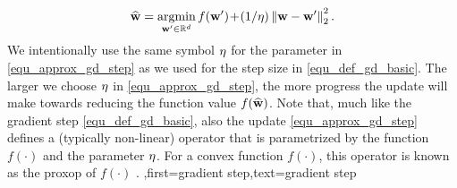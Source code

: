 {{		\begin{align} 
		\label{equ_approx_gd_step}
		\widehat{{\bf w}} = \operatorname*{argmin}_{{\bf w}' \in \mathbb{R}^{d}} f({\bf w}')\!+\!(1/\eta)\left\Vert {{\bf w}-{\bf w}'} \right\Vert_{2}^2. 
		\end{align}
		We intentionally use the same symbol $\eta$ for the parameter in \eqref{equ_approx_gd_step} 
		as we used for the step size in \eqref{equ_def_gd_basic}. The larger we choose $\eta$ in 
		\eqref{equ_approx_gd_step}, the more progress the update will make towards reducing the 
		function value $f(\widehat{{\bf w}})$. Note that, much like the gradient step \eqref{equ_def_gd_basic}, 
		also the update \eqref{equ_approx_gd_step} defines a (typically non-linear) operator 
		that is parametrized by the function $f(\cdot)$ and the parameter $\eta$. For a \gls{convex} function 
		$f(\cdot)$, this operator is known as the \gls{proxop} of $f(\cdot)$ \cite{ProximalMethods}. 
		},first={gradient step},text={gradient step}}
	

